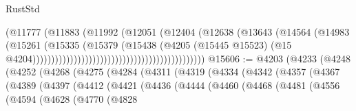 \begin{lexlean}{RustStd}
\begin{coremodule}
                                                                  (@11777
                                                                    (@11883
                                                                      (@11992
                                                                        (@12051
                                                                          (@12404
                                                                            (@12638
                                                                              (@13643
                                                                                (@14564
                                                                                  (@14983
                                                                                    (@15261
                                                                                      (@15335
                                                                                        (@15379
                                                                                          (@15438
                                                                                            (@4205
                                                                                              (@15445
                                                                                                @15523)
                                                                                              (@15
                                                                                                @4204))))))))))))))))))))))))))))))))))))))))))))))
@15606 := @4203
    (@4233
      (@4248
        (@4252
          (@4268
            (@4275
              (@4284
                (@4311
                  (@4319
                    (@4334
                      (@4342
                        (@4357
                          (@4367
                            (@4389
                              (@4397
                                (@4412
                                  (@4421
                                    (@4436
                                      (@4444
                                        (@4460
                                          (@4468
                                            (@4481
                                              (@4556
                                                (@4594
                                                  (@4628
                                                    (@4770
                                                      (@4828

\end{coremodule}
\end{lexlean}
